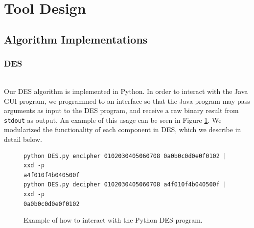 \documentclass[acmlarge]{acmart}
\begin{document}
\section{Tool Design} \label{sec:impl}
\subsection{Algorithm Implementations} \label{sec:algorithms}
\subsubsection{DES}
\hspace*{\fill} \\ %
Our DES algorithm is implemented in Python. In order to interact with the Java GUI program, we programmed to an interface so that the Java program may pass arguments as input to the DES program, and receive a raw binary result from \texttt{stdout} as output. An example of this usage can be seen in Figure \ref{fig:despython}. We modularized the functionality of each component in DES, which we describe in detail below.

\begin{figure}
\centering
\begin{BVerbatim}
python DES.py encipher 0102030405060708 0a0b0c0d0e0f0102 | xxd -p
a4f010f4b040500f
python DES.py decipher 0102030405060708 a4f010f4b040500f | xxd -p
0a0b0c0d0e0f0102
\end{BVerbatim}
\caption{Example of how to interact with the Python DES program.}
\label{fig:despython}
\end{figure}
\end{document}
